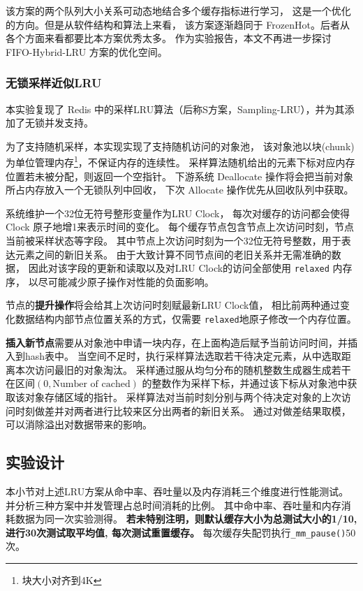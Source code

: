 该方案的两个队列大小关系可动态地结合多个缓存指标进行学习，
这是一个优化的方向。但是从软件结构和算法上来看，
该方案逐渐趋同于 FrozenHot。后者从各个方面来看都要比本方案优秀太多。
作为实验报告，本文不再进一步探讨 FIFO-Hybrid-LRU 方案的优化空间。

\subsubsection{无锁采样近似LRU}

本实验复现了 Redis 中的采样LRU算法（后称S方案，Sampling-LRU），并为其添加了无锁并发支持。

为了支持随机采样，本实现实现了支持随机访问的对象池，
该对象池以块(chunk)为单位管理内存\footnote{块大小对齐到4K}，不保证内存的连续性。
采样算法随机给出的元素下标对应内存位置若未被分配，则返回一个空指针。
下游系统 Deallocate 操作将会把当前对象所占内存放入一个无锁队列中回收，
下次 Allocate 操作优先从回收队列中获取。

系统维护一个32位无符号整形变量作为LRU Clock，
每次对缓存的访问都会使得Clock 原子地增1来表示时间的变化。
每个缓存节点包含节点上次访问时刻，节点当前被采样状态等字段。
其中节点上次访问时刻为一个32位无符号整数，用于表达元素之间的新旧关系。
由于大致计算不同节点间的老旧关系并无需准确的数据，
因此对该字段的更新和读取以及对LRU Clock的访问全部使用 \verb|relaxed| 内存序，
以尽可能减少原子操作对性能的负面影响。

节点的\textbf{提升操作}将会给其上次访问时刻赋最新LRU Clock值，
相比前两种通过变化数据结构内部节点位置关系的方式，仅需要 \verb|relaxed|地原子修改一个内存位置。

\textbf{插入新节点}需要从对象池中申请一块内存，在上面构造后赋予当前访问时间，并插入到hash表中。
当空间不足时，执行采样算法选取若干待决定元素，从中选取距离本次访问最旧的对象淘汰。
采样通过服从均匀分布的随机整数生成器生成若干在区间$\allowbreak (0, \mbox{Number of cached})$
的整数作为采样下标，并通过该下标从对象池中获取该对象存储区域的指针。
采样算法对当前时刻分别与两个待决定对象的上次访问时刻做差并对两者进行比较来区分出两者的新旧关系。
通过对做差结果取模，可以消除溢出对数据带来的影响。

\subsection{实验设计}

本小节对上述LRU方案从命中率、吞吐量以及内存消耗三个维度进行性能测试。
并分析三种方案中并发管理占总时间消耗的比例。
其中命中率、吞吐量和内存消耗数据为同一次实验测得。
\textbf{若未特别注明，则默认缓存大小为总测试大小的1/10, 进行30次测试取平均值, 每次测试重置缓存。}
每次缓存失配罚执行\verb|_mm_pause()|50次。

